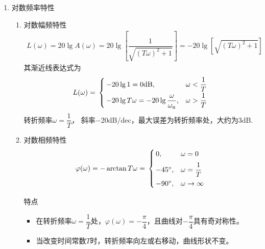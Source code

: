 \begin{enumerate}[1.]
\begin{enumerate}[(1) ]
	\end{enumerate}
	\item 对数频率特性
	\begin{enumerate}[(1) ]
		\item 对数幅频特性
		\vspace*{-0.5em}
		\begin{align}
			L(\omega) = 20 \lg A(\omega) = 20 \lg \left[\dfrac{1}{\sqrt{(T \omega)^2 + 1}}\right] = -20 \lg \left[\sqrt{(T \omega)^2 + 1}\right]
		\end{align}
		其渐近线表达式为
		\begin{align}
			L(\omega) = \,
			\begin{cases}
				\, -20 \lg 1 = 0 \text{dB}, & \omega < \dfrac{1}{T}\\[0.5em]
				\, -20 \lg T\omega = - 20 \lg \dfrac{\omega}{\omega_{\rm{n}}} , & \omega > \dfrac{1}{T}
			\end{cases}
		\end{align}
		转折频率$\omega = \dfrac{1}{T}$， 斜率$-$20dB/dec，最大误差为转折频率处，大约为3dB.
		\item 对数相频特性
		\vspace*{-0.5em}
		\begin{align}
			\varphi(\omega) = -\arctan T\omega = \,
			\begin{cases}
				\, 0, & \omega = 0\\[0.5em]
				\, -45{}^{\circ} , & \omega = \dfrac{1}{T}\\[0.5em]
				\, -90 {}^{\circ}, & \omega \to \infty
			\end{cases}
		\end{align}
		\vspace*{-3em}
		
		特点
		\begin{itemize}
			\item 在转折频率$\omega = \dfrac{1}{T}$处，$\varphi(\omega) =  -\dfrac{\pi}{4}$，且曲线对$-\dfrac{\pi}{4}$具有奇对称性。
			\item 当改变时间常数$T$时，转折频率向左或右移动，曲线形状不变。
		\end{itemize}
	\end{enumerate}
\end{enumerate}


